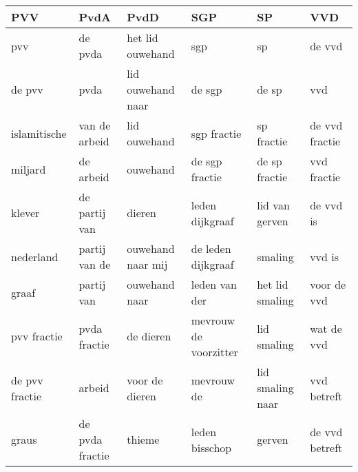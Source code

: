 \begin{tabular}{llllll}
\toprule
            PVV &             PvdA &               PvdD &                    SGP &                SP &             VVD \\
\midrule
            pvv &          de pvda &   het lid ouwehand &                    sgp &                sp &          de vvd \\
         de pvv &             pvda &  lid ouwehand naar &                 de sgp &             de sp &             vvd \\
   islamitische &    van de arbeid &       lid ouwehand &            sgp fractie &        sp fractie &  de vvd fractie \\
        miljard &        de arbeid &           ouwehand &         de sgp fractie &     de sp fractie &     vvd fractie \\
         klever &    de partij van &             dieren &        leden dijkgraaf &    lid van gerven &       de vvd is \\
      nederland &    partij van de &  ouwehand naar mij &     de leden dijkgraaf &           smaling &          vvd is \\
          graaf &       partij van &      ouwehand naar &          leden van der &   het lid smaling &     voor de vvd \\
    pvv fractie &     pvda fractie &          de dieren &  mevrouw de voorzitter &       lid smaling &      wat de vvd \\
 de pvv fractie &           arbeid &     voor de dieren &             mevrouw de &  lid smaling naar &     vvd betreft \\
          graus &  de pvda fractie &             thieme &         leden bisschop &            gerven &  de vvd betreft \\
\bottomrule
\end{tabular}
